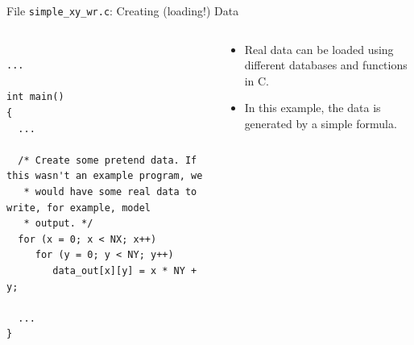 \documentclass[compress,11pt,xcolor=svgnames,aspectratio=169]{beamer}
\begin{document}
\begin{frame}[fragile]{File \texttt{simple\_xy\_wr.c}: Creating (loading!) Data}

\begin{columns}

\begin{column}{0.5\textwidth}

{\tiny

\begin{verbatim}

...

int main()
{
  ...

  /* Create some pretend data. If this wasn't an example program, we
   * would have some real data to write, for example, model
   * output. */
  for (x = 0; x < NX; x++)
     for (y = 0; y < NY; y++)
        data_out[x][y] = x * NY + y;

  ...
}

\end{verbatim}

}

\end{column}

\begin{column}{0.5\textwidth}

{\footnotesize

\begin{itemize}
\setlength\itemsep{0.5cm}

\item Real data can be loaded using different databases and functions in C.

\item In this example, the data is generated by a simple formula.

\end{itemize}

}

\end{column}

\end{columns}

\end{frame}
\end{document}
